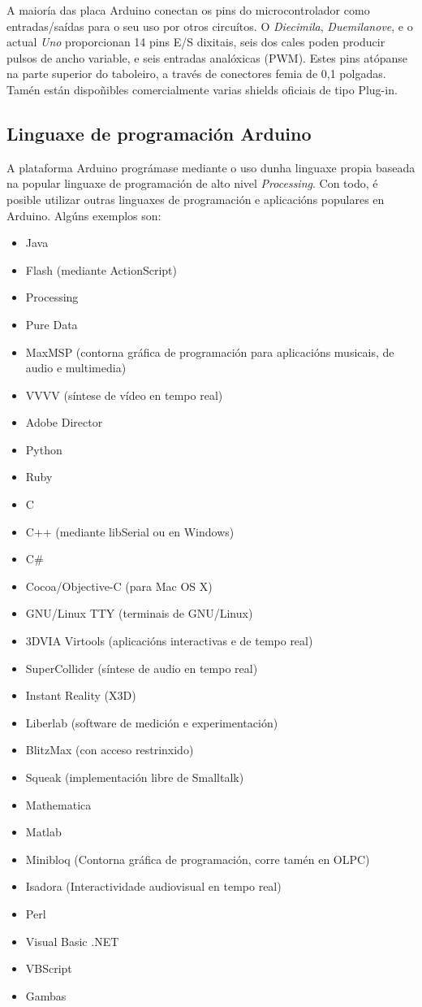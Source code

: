  A maioría das placa Arduino conectan os pins do microcontrolador como
 entradas/saídas para o seu uso por otros circuítos. O \textit{Diecimila},
 \textit{Duemilanove}, e o actual \textit{Uno} proporcionan 14 pins E/S
 dixitais, seis dos cales poden producir pulsos de ancho variable, e seis
 entradas analóxicas (PWM). Estes pins atópanse na parte superior do taboleiro,
 a través de conectores femia de 0,1 polgadas. Tamén están dispoñibles
 comercialmente varias shields oficiais de tipo Plug-in.

 \subsection{Linguaxe de programación Arduino}

 A plataforma Arduino prográmase mediante o uso dunha linguaxe propia baseada
 na popular linguaxe de programación de alto nivel \textit{Processing}. Con
 todo, é posible utilizar outras linguaxes de programación e aplicacións
 populares en Arduino. Algúns exemplos son:

 \begin{itemize}
  \item Java
  \item Flash (mediante ActionScript)
  \item Processing
  \item Pure Data
  \item MaxMSP (contorna gráfica de programación para aplicacións musicais, de audio e multimedia)
  \item VVVV (síntese de vídeo en tempo real)
  \item Adobe Director
  \item Python
  \item Ruby
  \item C
  \item C++ (mediante libSerial ou en Windows)
  \item C\#
  \item Cocoa/Objective-C (para Mac OS X)
  \item GNU/Linux TTY (terminais de GNU/Linux)
  \item 3DVIA Virtools (aplicacións interactivas e de tempo real)
  \item SuperCollider (síntese de audio en tempo real)
  \item Instant Reality (X3D)
  \item Liberlab (software de medición e experimentación)
  \item BlitzMax (con acceso restrinxido)
  \item Squeak (implementación libre de Smalltalk)
  \item Mathematica
  \item Matlab
  \item Minibloq (Contorna gráfica de programación, corre tamén en OLPC)
  \item Isadora (Interactividade audiovisual en tempo real)
  \item Perl
  \item Visual Basic .NET
  \item VBScript
  \item Gambas
 \end{itemize}

